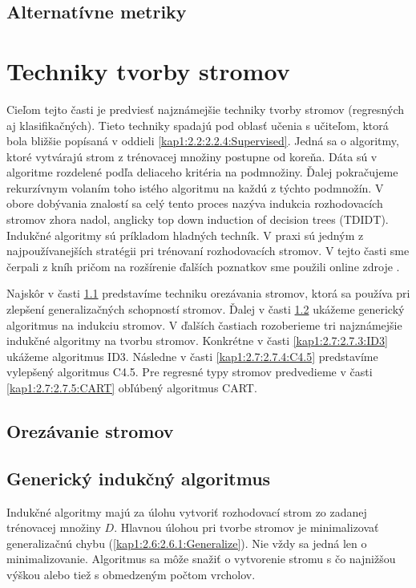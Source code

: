\subsection{Alternatívne metriky}\label{kap1:2.6:2.6.2:Alternatives}

\section{Techniky tvorby stromov}\label{kap1:2.7:DTTechniques}
Cieľom tejto časti je predviesť najznámejšie techniky tvorby stromov (regresných aj klasifikačných). Tieto techniky spadajú pod oblasť učenia s učiteľom, ktorá bola bližšie popísaná v oddieli \ref{kap1:2.2:2.2.4:Supervised}. Jedná sa o algoritmy, ktoré vytvárajú strom z trénovacej množiny postupne od koreňa. Dáta sú v algoritme rozdelené podľa deliaceho kritéria na podmnožiny. Ďalej pokračujeme rekurzívnym volaním toho istého algoritmu na každú z týchto podmnožín. V obore dobývania znalostí sa celý tento proces nazýva indukcia rozhodovacích stromov zhora nadol, anglicky top down induction of decision trees (TDIDT). Indukčné algoritmy sú príkladom hladných techník. V praxi sú jedným z najpoužívanejších stratégii pri trénovaní rozhodovacích stromov. V tejto časti sme čerpali z kníh \cite{kap1-DataMiningForTrees,kap1-DataMiningAndAnalysis} pričom na rozšírenie ďalších poznatkov sme použili online zdroje \cite{online-SplitCriterias,online-SplitCriteriasMatter,online-DTLectures}.

Najskôr v časti \ref{kap1:2.7:2.7.1:Pruning} predstavíme techniku orezávania stromov, ktorá sa používa pri zlepšení generalizačných schopností stromov. Ďalej v časti \ref{kap1:2.7:2.7.2:Generic} ukážeme generický algoritmus na indukciu stromov. V ďalších častiach rozoberieme tri najznámejšie indukčné algoritmy na tvorbu stromov. Konkrétne v časti \ref{kap1:2.7:2.7.3:ID3} ukážeme algoritmus ID3. Následne v časti \ref{kap1:2.7:2.7.4:C4.5} predstavíme vylepšený algoritmus C4.5. Pre regresné typy stromov predvedieme v časti \ref{kap1:2.7:2.7.5:CART} obľúbený algoritmus CART.

\subsection{Orezávanie stromov}\label{kap1:2.7:2.7.1:Pruning}

\subsection{Generický indukčný algoritmus}\label{kap1:2.7:2.7.2:Generic}
Indukčné algoritmy majú za úlohu vytvoriť rozhodovací strom zo zadanej trénovacej množiny $D$. Hlavnou úlohou pri tvorbe stromov je minimalizovať generalizačnú chybu (\ref{kap1:2.6:2.6.1:Generalize}). Nie vždy sa jedná len o minimalizovanie. Algoritmus sa môže snažiť o vytvorenie stromu s čo najnižšou výškou alebo tiež s obmedzeným počtom vrcholov.


